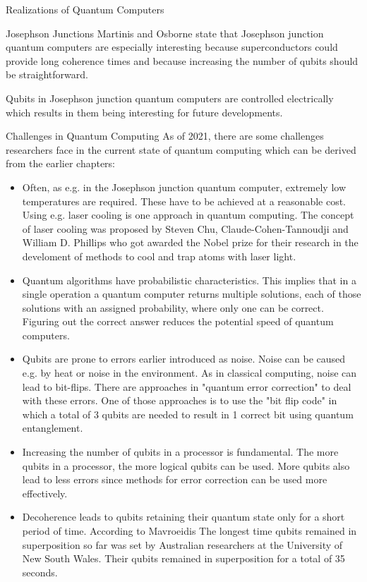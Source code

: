 \documentclass[aps,preprintnumbers,twocolumn]{revtex4}
\begin{document}
\begin{section}{Realizations of Quantum Computers}
\begin{subsection}{Josephson Junctions}
Martinis and Osborne state \cite[p.3]{martinis} that Josephson junction quantum computers are especially interesting because superconductors could provide long coherence times and because increasing the number of qubits should be straightforward. 

Qubits in Josephson junction quantum computers are controlled electrically which results in them being interesting for future developments.
\end{subsection}

\begin{section}{Challenges in Quantum Computing}
As of 2021, there are some challenges researchers face in the current state of quantum computing which can be derived from the earlier chapters: 

\begin{itemize}
    \item Often, as e.g. in the Josephson junction quantum computer, extremely low temperatures are required. These have to be achieved at a reasonable cost. Using e.g. laser cooling is one approach in quantum computing. The concept of laser cooling was proposed by Steven Chu, Claude-Cohen-Tannoudji and William D. Phillips who got awarded the Nobel prize for their research in the develoment of methods to cool and trap atoms with laser light.
    \item Quantum algorithms have probabilistic characteristics. 
    This implies that in a single operation a quantum computer returns multiple solutions, each of those solutions with an assigned probability, where only one can be correct. 
    Figuring out the correct answer reduces the potential speed of quantum computers.
    \item Qubits are prone to errors earlier introduced as noise. 
    Noise can be caused e.g. by heat or noise in the environment. 
    As in classical computing, noise can lead to bit-flips. There are approaches in "quantum error correction" to deal with these errors. 
    One of those approaches is to use the "bit flip code" in which a total of 3 qubits are needed to result in 1 correct bit using quantum entanglement.  
    \item Increasing the number of qubits in a processor is fundamental. The more qubits in a processor, the more logical qubits can be used. More qubits also lead to less errors since methods for error correction can be used more effectively.
    \item Decoherence leads to qubits retaining their quantum state only for a short period of time. 
    According to Mavroeidis \cite[p.3]{DBLP:journals/corr/abs-1804-00200} The longest time qubits remained in superposition so far was set by Australian researchers at the University of New South Wales. 
    Their qubits remained in superposition for a total of 35 seconds.
\end{itemize}

\end{section}

\end{section}
\end{document}
